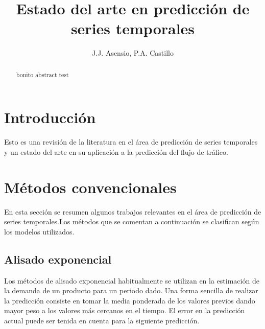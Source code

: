 \documentclass{llncs}
\begin{document}

\title{Estado del arte en predicción de series temporales}


\author{J.J. Asensio, P.A. Castillo}


\maketitle
%
%
\begin{abstract} 
bonito abstract test
\end{abstract}


%
%
\section{Introducción}
\label{sec:intro}

Esto es una revisión de la literatura en el área de predicción de series temporales y un estado del arte en su aplicación a la predicción del flujo de tráfico.


\section{Métodos convencionales}

En esta sección se resumen algunos trabajos relevantes en el área de predicción de series temporales.Los métodos que se comentan a continuación se clasifican según los modelos utilizados. 

\subsection{Alisado exponencial}

Los métodos de alisado exponencial habitualmente se utilizan en la estimación de la demanda de un producto para un periodo dado. Una forma sencilla de realizar la predicción consiste en tomar la media ponderada de los valores previos dando mayor peso a los valores más cercanos en el tiempo. El error en la predicción actual puede ser tenida en cuenta para la siguiente predicción.
\end{document}
